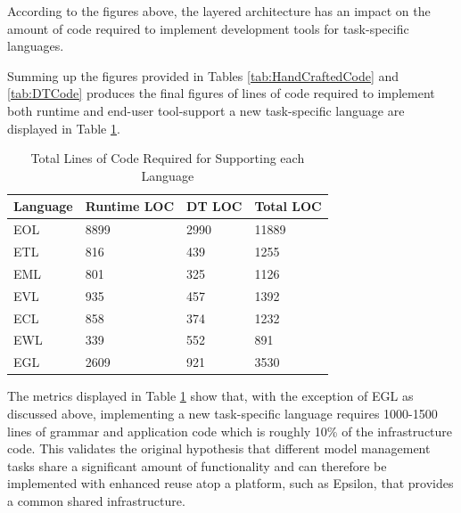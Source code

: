 According to the figures above, the layered architecture has an impact on the amount of code required to implement development tools for task-specific languages.

Summing up the figures provided in Tables \ref{tab:HandCraftedCode} and \ref{tab:DTCode} produces the final figures of lines of code required to implement both runtime and end-user tool-support a new task-specific language are displayed in Table \ref{tab:DTAndHandCraftedCode}.

\begin{table}
	\centering
		\begin{tabular}{|l|l|l|l|}\hline
			\textbf{Language} & \textbf{Runtime LOC} & \textbf{DT LOC} & \textbf{Total LOC} \\\hline
		EOL	& 8899 & 2990 & 11889\\\hline
		ETL	&	816 & 439 & 1255\\\hline
		EML	&	801 & 325 & 1126\\\hline
		EVL	&	935 & 457 & 1392\\\hline
		ECL	&	858 & 374 & 1232\\\hline
		EWL	&	339 & 552 & 891\\\hline
		EGL	&	2609 & 921 & 3530\\\hline
		\end{tabular}
	\caption{Total Lines of Code Required for Supporting each Language}
	\label{tab:DTAndHandCraftedCode}
\end{table}

The metrics displayed in Table \ref{tab:DTAndHandCraftedCode} show that, with the exception of EGL as discussed above, implementing a new task-specific language requires 1000-1500 lines of grammar and application code which is roughly 10\% of the infrastructure code. This validates the original hypothesis that different model management tasks share a significant amount of functionality and can therefore be implemented with enhanced reuse atop a platform, such as Epsilon, that provides a common shared infrastructure.

